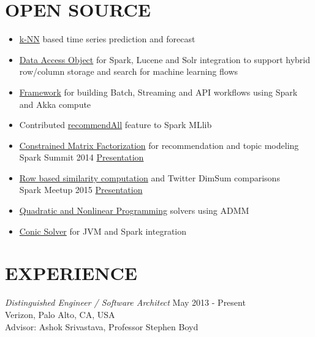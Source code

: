 \documentclass[margin]{res}
\begin{document}
\begin{resume}
\section{OPEN SOURCE}
\begin{itemize} \itemsep -2pt
\item \href{https://github.com/sryza/spark-timeseries/pull/200} {k-NN} based
  time series prediction and forecast

\item \href{https://github.com/Verizon/trapezium/tree/master/dal} {Data Access Object} for
  Spark, Lucene and Solr integration to support hybrid row/column storage and
  search for machine learning flows

\item \href{https://github.com/Verizon/trapezium/tree/master/framework}
  {Framework} for building Batch, Streaming and API workflows using Spark and Akka compute

\item Contributed \href{https://issues.apache.org/jira/browse/SPARK-3066} {recommendAll} feature to Spark MLlib

\item \href {https://issues.apache.org/jira/browse/SPARK-2426} {Constrained
  Matrix Factorization} for recommendation and topic modeling\\
Spark Summit 2014 \href {http://debasish83.github.io/quadprog/SparkSummit072014.html} {Presentation}

\item \href{https://issues.apache.org/jira/browse/SPARK-4823} {Row based similarity computation} and Twitter DimSum comparisons\\
Spark Meetup 2015 \href{http://debasish83.github.io/spark-meetup-july2015/mf-slides.pdf} {Presentation}

\item \href{https://github.com/scalanlp/breeze/tree/master/math/src/main/scala/breeze/optimize}{Quadratic
and Nonlinear Programming} solvers using ADMM

\item \href{https://github.com/embotech/ecos-java-scala} {Conic Solver} for JVM and Spark integration
\end{itemize}

\section{EXPERIENCE}

{\sl Distinguished Engineer / Software Architect} \hfill May 2013 - Present\\
Verizon, Palo Alto, CA, USA\\
Advisor: Ashok Srivastava, Professor Stephen Boyd
\begin{itemize} \itemsep -2pt


\end{itemize}
\end{resume}
\end{document}
